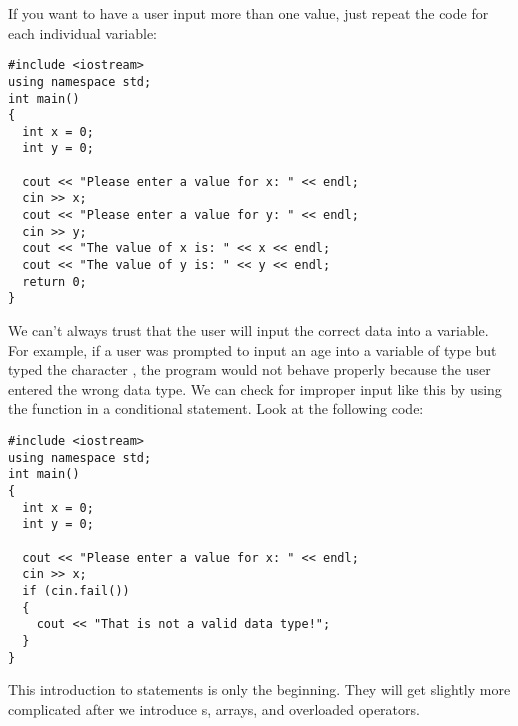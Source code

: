 If you want to have a user input more than one value, just repeat the code for each individual variable:

\noindent\begin{minipage}{\linewidth}\begin{lstlisting}
#include <iostream>
using namespace std;
int main()
{
  int x = 0;
  int y = 0;
	
  cout << "Please enter a value for x: " << endl;
  cin >> x;
  cout << "Please enter a value for y: " << endl;
  cin >> y;
  cout << "The value of x is: " << x << endl;
  cout << "The value of y is: " << y << endl;
  return 0;
}
\end{lstlisting}\end{minipage}

We can't always trust that the user will input the correct data into a variable. 
For example, if a user was prompted to input an age into a variable of type  but typed the character , the program would not behave properly because the user entered the wrong data type. 
We can check for improper input like this by using the  function in a conditional statement.
Look at the following code:

\noindent\begin{minipage}{\linewidth}\begin{lstlisting}
#include <iostream>
using namespace std;
int main()
{
  int x = 0;
  int y = 0;
	
  cout << "Please enter a value for x: " << endl;
  cin >> x;
  if (cin.fail())
  {
    cout << "That is not a valid data type!";
  }
}
\end{lstlisting}\end{minipage}

This introduction to  statements is only the beginning. 
They will get slightly more complicated after we introduce s, arrays, and overloaded operators.

